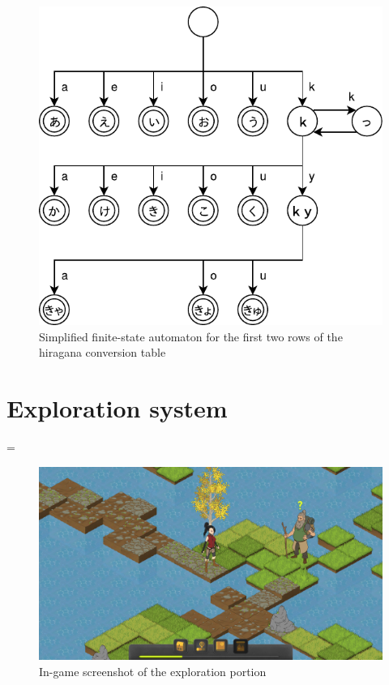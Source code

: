 \documentclass[thesis=B,english,hidelinks]{FITthesisXE}[2012/06/26]
\begin{document}
\begin{figure}[ht]
\centering
\includegraphics[scale=1]{kana_parser}
\caption{Simplified finite-state automaton for the first two rows of the hiragana conversion table}
\label{fig:kana_parser}
\end{figure}

\chapter{Exploration system}

\emergencystretch=\maxdimen
{}

\begin{figure}[ht]
\centering
\includegraphics[scale=0.2]{explore}
\caption{In-game screenshot of the exploration portion}
\label{fig:explore}
\end{figure}
\end{document}
